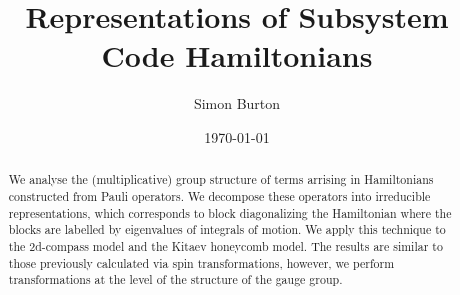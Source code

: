\documentclass[12pt]{article}
\begin{document}
\title{Representations of Subsystem Code Hamiltonians}

\author{Simon Burton}

\date{\today}


\maketitle

\begin{abstract}
We analyse the (multiplicative) group structure of terms arrising
in Hamiltonians constructed from Pauli operators.
We decompose these operators into irreducible 
representations, which corresponds to block diagonalizing
the Hamiltonian where the blocks are labelled by
eigenvalues of integrals of motion.
We apply this technique to the 2d-compass model
and the Kitaev honeycomb model.
The results are similar to those previously 
calculated via spin transformations,
however, we perform transformations at
the level of the structure of the gauge group.
\end{abstract}



\def\Complex{\mathbb{C}}
\def\C{\mathbb{C}}
\def\R{\mathbb{R}}
\def\Z{\mathbb{Z}}
\def\Ham{\mathcal{H}}
\def\Pauli{\mathcal{P}}
\def\Spec{\mbox{Spec}}
\def\Proveit{{\it (Proof??)}}
\def\GL{\mathrm{GL}}
\def\half{\frac{1}{2}}
\def\Stab{S}

\newcommand{\ket}[1]{|{#1}\rangle}
\newcommand{\expect}[1]{\langle{#1}\rangle}
\newcommand{\bra}[1]{\langle{#1}|}
\newcommand{\ketbra}[2]{\ket{#1}\!\bra{#2}}
\newcommand{\braket}[2]{\langle{#1}|{#2}\rangle}


%
%
\end{document}
